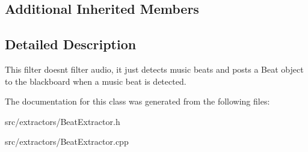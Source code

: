 \subsection*{Additional Inherited Members}


\subsection{Detailed Description}
This filter doesn\textquotesingle{}t filter audio, it just detects music beats and posts a Beat object to the blackboard when a music beat is detected. 

The documentation for this class was generated from the following files\+:\begin{DoxyCompactItemize}
\item 
src/extractors/Beat\+Extractor.\+h\item 
src/extractors/Beat\+Extractor.\+cpp\end{DoxyCompactItemize}
